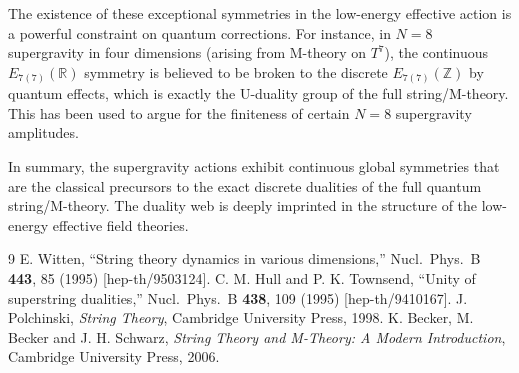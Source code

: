 \documentclass[11pt]{article}
\begin{document}
The existence of these exceptional symmetries in the low-energy effective action is a powerful constraint on quantum corrections. For instance, in $N=8$ supergravity in four dimensions (arising from M-theory on $T^7$), the continuous $E_{7(7)}(\mathbb{R})$ symmetry is believed to be broken to the discrete $E_{7(7)}(\mathbb{Z})$ by quantum effects, which is exactly the U-duality group of the full string/M-theory. This has been used to argue for the finiteness of certain $N=8$ supergravity amplitudes.

In summary, the supergravity actions exhibit continuous global symmetries that are the classical precursors to the exact discrete dualities of the full quantum string/M-theory. The duality web is deeply imprinted in the structure of the low-energy effective field theories.

\begin{thebibliography}{9}
 E. Witten, ``String theory dynamics in various dimensions,'' Nucl.\ Phys.\ B \textbf{443}, 85 (1995) [hep-th/9503124].
 C. M. Hull and P. K. Townsend, ``Unity of superstring dualities,'' Nucl.\ Phys.\ B \textbf{438}, 109 (1995) [hep-th/9410167].
 J. Polchinski, \textit{String Theory}, Cambridge University Press, 1998.
 K. Becker, M. Becker and J. H. Schwarz, \textit{String Theory and M-Theory: A Modern Introduction}, Cambridge University Press, 2006.
\end{thebibliography}
\end{document}
